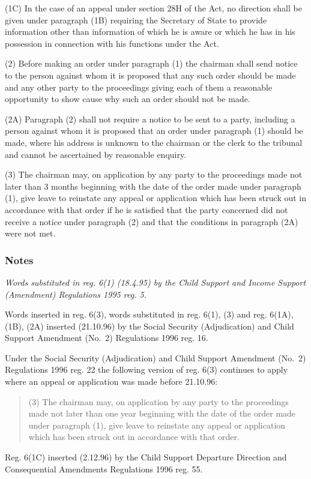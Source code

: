 \documentclass[a4paper]{article}
\newcommand\amendment[1]{\subsubsection*{Notes}{\itshape\frenchspacing\footnotesize #1 \par}}
\begin{document}
(1C) In the case of an appeal under section 28H of the Act, no direction shall
be given under paragraph (1B) requiring the Secretary of State to provide
information other than information of which he is aware or which he has in his
possession in connection with his functions under the Act.

(2) Before making an order under paragraph (1) the chairman shall send notice to the person against whom it is proposed that any such order should be made and any other party to the proceedings giving each of them a reasonable opportunity to show cause why such an order should not be made.

(2A) Paragraph (2) shall not require a notice to be sent to a party, including a person against whom it is proposed that an order under paragraph (1) should be made, where his address is unknown to the chairman or the clerk to the tribunal and cannot be ascertained by reasonable enquiry.

(3) The chairman may, on application by any party to the proceedings made not later than 
3 months  %
beginning with the date of the order made under paragraph (1), give leave to reinstate any appeal or application which has been struck out in accordance with that order
if he is satisfied that the party concerned did not receive a notice under paragraph (2) and that the conditions in paragraph (2A) were not met.  %

\amendment{
Words substituted in reg. 6(1) (18.4.95) by the Child Support and Income Support (Amendment) Regulations 1995 reg. 5.

Words inserted in reg. 6(3), words substituted in reg. 6(1), (3) and reg. 6(1A), (1B), (2A) inserted (21.10.96) by the Social Security (Adjudication) and Child Support Amendment (No.\ 2) Regulations 1996 reg. 16.

Under the Social Security (Adjudication) and Child Support Amendment (No.\ 2) Regulations 1996 reg. 22 the following version of reg. 6(3) continues to apply where an appeal or application was made before 21.10.96:
\begin{quotation}
(3) The chairman may, on application by any party to the proceedings made not later than one year beginning with the date of the order made under paragraph (1), give leave to reinstate any appeal or application which has been struck out in accordance with that order.
\end{quotation}

Reg. 6(1C) inserted (2.12.96) by the Child Support Departure Direction and Consequential Amendments Regulations 1996 reg. 55.
}
\end{document}
